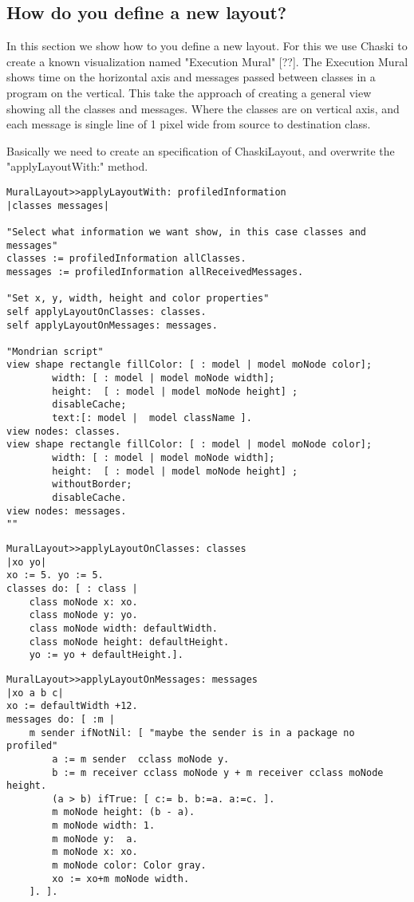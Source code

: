 \documentclass{sig-alternate}
\begin{document}
\subsection{How do you define a new layout?}

In this section we show how to you define a new layout. For this we use Chaski to create a known visualization named "Execution Mural" [??]. The Execution Mural shows time on the horizontal axis and messages passed between classes in a program on the vertical. This take the approach of creating a general view showing all the classes and messages. Where the classes are on vertical axis, and each message is single line of 1 pixel wide from source to destination class.

Basically we need to create an specification of ChaskiLayout, and overwrite the "applyLayoutWith:" method.
\begin{lstlisting}[language=Smalltalk]
MuralLayout>>applyLayoutWith: profiledInformation
|classes messages|

"Select what information we want show, in this case classes and messages"
classes := profiledInformation allClasses.
messages := profiledInformation allReceivedMessages.	

"Set x, y, width, height and color properties"
self applyLayoutOnClasses: classes.
self applyLayoutOnMessages: messages.

"Mondrian script"
view shape rectangle fillColor: [ : model | model moNode color];
		width: [ : model | model moNode width];
		height:  [ : model | model moNode height] ; 
		disableCache;
		text:[: model |  model className ].
view nodes: classes.
view shape rectangle fillColor: [ : model | model moNode color];
		width: [ : model | model moNode width];
		height:  [ : model | model moNode height] ; 
		withoutBorder;
		disableCache.
view nodes: messages.
""
\end{lstlisting}
\begin{lstlisting}[language=Smalltalk]
MuralLayout>>applyLayoutOnClasses: classes
|xo yo|
xo := 5. yo := 5.
classes do: [ : class | 
	class moNode x: xo.   
	class moNode y: yo.
	class moNode width: defaultWidth. 
	class moNode height: defaultHeight. 
	yo := yo + defaultHeight.].
\end{lstlisting}
\begin{lstlisting}[language=Smalltalk]
MuralLayout>>applyLayoutOnMessages: messages
|xo a b c|
xo := defaultWidth +12.
messages do: [ :m | 
	m sender ifNotNil: [ "maybe the sender is in a package no profiled"
		a := m sender  cclass moNode y.
		b := m receiver cclass moNode y + m receiver cclass moNode height.
		(a > b) ifTrue: [ c:= b. b:=a. a:=c. ].
		m moNode height: (b - a).
		m moNode width: 1.
		m moNode y:  a.
		m moNode x: xo.
		m moNode color: Color gray.
		xo := xo+m moNode width.
	]. ].
\end{lstlisting}
\end{document}

